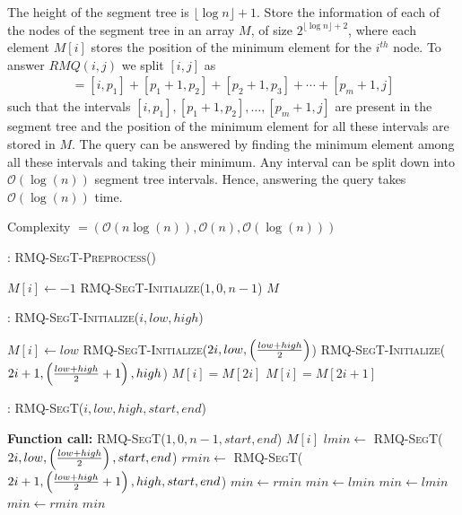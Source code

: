 \documentclass{article}
\begin{document}
The height of the segment tree is $\lfloor \log n \rfloor + 1$. Store the information of each of the nodes of the segment tree in an array $M$, of size $2^{\lfloor \log n \rfloor + 2}$, where each element $M[i]$ stores the position of the minimum element for the  $i^{th}$ node. To answer $RMQ(i, j)$ we split $[i, j]$ as
\begin{align*}
[i, j] = [i, p_1] + [p_1+1, p_2] + [p_2 + 1, p_3] + \cdots + [p_m+1, j]
\end{align*}
such that the intervals $[i, p_1], [p_1+1, p_2], \ldots, [p_m+1, j]$ are present in the segment tree and the position of the minimum element for all these intervals are stored in $M$. The query can be answered by finding the minimum element among all these intervals and taking their minimum. Any interval can be split down into $\mathcal{O}(\log (n))$ segment tree intervals. Hence, answering the query takes $\mathcal{O}(\log (n))$ time.

Complexity $= (\mathcal{O}(n \log(n)), \mathcal{O}(n), \mathcal{O}(\log (n)))$

\begin{algorithm}
\begin{algorithmic}[1]
\caption{: \textsc{RMQ-SegT-Preprocess}()}
\medskip
{}
	\STATE $M[i] \gets -1$
\ENDFOR
\medskip
\STATE \textsc{RMQ-SegT-Initialize($1, 0, n-1$)}
\medskip
\RETURN $M$
\medskip
\end{algorithmic}
\end{algorithm}

\begin{algorithm}
\begin{algorithmic}[1]
\caption{: \textsc{RMQ-SegT-Initialize}($i, low, high$)}
\medskip
{}
	\STATE $M[i] \gets low$
	\RETURN
\ENDIF
\medskip
\STATE \textsc{RMQ-SegT-Initialize($2i, low, \left( {low + high \over 2} \right)$)}
\STATE \textsc{RMQ-SegT-Initialize($2i + 1, \left( {low + high \over 2} + 1 \right), high$)}
\medskip
{}
	\STATE $M[i] = M[2i]$
\ELSE
	\STATE $M[i] = M[2i+1]$
\ENDIF
\medskip
\RETURN
\medskip
\end{algorithmic}
\end{algorithm}

\begin{algorithm}
\begin{algorithmic}[1]
\caption{: \textsc{RMQ-SegT}($i, low, high, start, end$)}
\medskip
\STATE \textbf{Function call:} \textsc{RMQ-SegT}($1, 0, n-1, start, end$)
\medskip
{}
\ENDIF
{}
	\RETURN $M[i]$
\ENDIF
\medskip
\STATE $lmin \gets $ \textsc{RMQ-SegT}($2i, low, \left( {low + high \over 2} \right), start, end$)
\STATE $rmin \gets $ \textsc{RMQ-SegT}($2i+1, \left( {low + high \over 2} + 1 \right), high, start, end$)
\medskip
{}
	\STATE $min \gets rmin$
	\STATE $min \gets lmin$
	\STATE $min \gets lmin$
\ELSE
	\STATE $min \gets rmin$
\ENDIF
\medskip
\RETURN $min$
\medskip
\end{algorithmic}
\end{algorithm}
\end{document}
